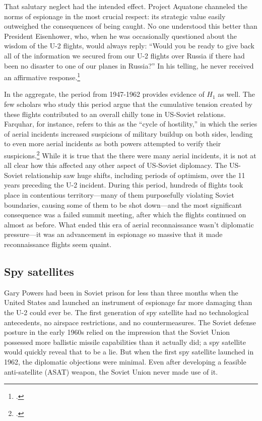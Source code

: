 \documentclass[12pt]{extarticle}
\begin{document}
That salutary neglect had the intended effect. Project Aquatone channeled the norms of espionage in the most crucial respect: its strategic value easily outweighed the consequences of being caught. No one understood this better than President Eisenhower, who, when he was occasionally questioned about the wisdom of the U-2 flights, would always reply: \enquote{Would you be ready to give back all of the information we secured from our U-2 flights over Russia if there had been no disaster to one of our planes in Russia?} In his telling, he never received an affirmative response.\footcite[559]{eisenhower_waging_1965}

In the aggregate, the period from 1947-1962 provides evidence of $H_1$ as well. The few scholars who study this period argue that the cumulative tension created by these flights contributed to an overall chilly tone in US-Soviet relations. Farquhar, for instance, refers to this as the \enquote{cycle of hostility,} in which the series of aerial incidents increased suspicions of military buildup on both sides, leading to even more aerial incidents as both powers attempted to verify their suspicions.\footcite[43]{farquhar_aerial_2015} While it is true that the there were many aerial incidents, it is not at all clear how this affected any other aspect of US-Soviet diplomacy. The US-Soviet relationship saw huge shifts, including periods of optimism, over the 11 years preceding the U-2 incident. During this period, hundreds of flights took place in contentious territory---many of them purposefully violating Soviet boundaries, causing some of them to be shot down---and the most significant consequence was a failed summit meeting, after which the flights continued on almost as before. What ended this era of aerial reconnaissance wasn't diplomatic pressure---it was an advancement in espionage so massive that it made reconnaissance flights seem quaint.

\subsection{Spy satellites}
Gary Powers had been in Soviet prison for less than three months when the United States and launched an instrument of espionage far more damaging than the U-2 could ever be. The first generation of spy satellite had no technological antecedents, no airspace restrictions, and no countermeasures. The Soviet defense posture in the early 1960s relied on the impression that the Soviet Union possessed more ballistic missile capabilities than it actually did; a spy satellite would quickly reveal that to be a lie. But when the first spy satellite launched in 1962, the diplomatic objections were minimal. Even after developing a feasible anti-satellite (ASAT) weapon, the Soviet Union never made use of it.
\end{document}
